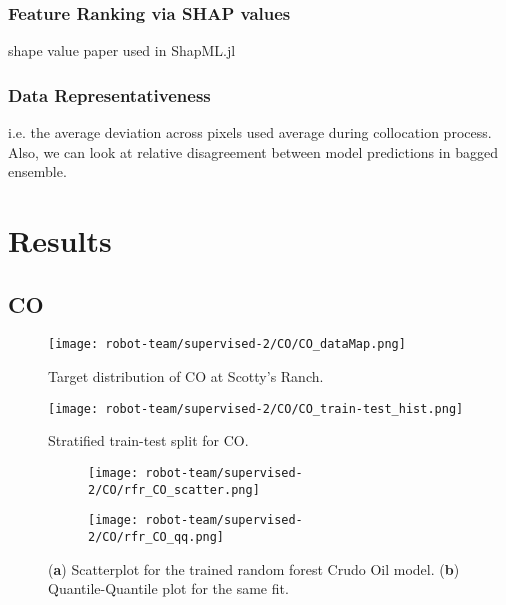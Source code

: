\subsubsection{Feature Ranking via SHAP values}

shape value paper used in ShapML.jl \cite{SHAPvalues1}

\subsubsection{Data Representativeness}
i.e. the average deviation across pixels used average during collocation process.
Also, we can look at relative disagreement between model predictions in bagged ensemble. 

\section{Results}
\subsection{CO}

\begin{figure}[h]
\texttt{[image: robot-team/supervised-2/CO/CO\_dataMap.png]}
\caption{Target distribution of CO at Scotty's Ranch.\label{CO_targetMap}}
\end{figure}

\begin{figure}[h]
\texttt{[image: robot-team/supervised-2/CO/CO\_train-test\_hist.png]}
\caption{Stratified train-test split for CO.\label{CO_trainTestHist}}
\end{figure}

\begin{figure}[h]
  \begin{subfigure}{0.5\textwidth}
    \centering
    \texttt{[image: robot-team/supervised-2/CO/rfr\_CO\_scatter.png]}
  \end{subfigure}
  \begin{subfigure}{0.5\textwidth}
    \centering
    \texttt{[image: robot-team/supervised-2/CO/rfr\_CO\_qq.png]}
  \end{subfigure}
  \caption{(\textbf{a}) Scatterplot for the trained random forest Crudo Oil model. (\textbf{b}) Quantile-Quantile plot for the same fit.}
  \label{CO_fitresult}
\end{figure}



